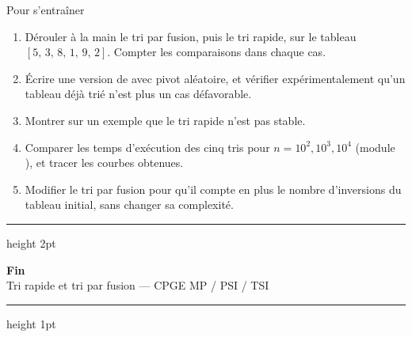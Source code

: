 \documentclass[11pt,aspectratio=169]{beamer}
\begin{document}
\begin{frame}{Pour s'entraîner}
\begin{enumerate}\small\setlength\itemsep{5pt}
  \item Dérouler à la main le tri par fusion, puis le tri rapide, sur le tableau
        $[5,\,3,\,8,\,1,\,9,\,2]$. Compter les comparaisons dans chaque cas.
  \item Écrire une version de  avec pivot aléatoire, et vérifier
        expérimentalement qu'un tableau déjà trié n'est plus un cas défavorable.
  \item Montrer sur un exemple que le tri rapide n'est pas stable.
  \item Comparer les temps d'exécution des cinq tris pour
        $n=10^2,10^3,10^4$ (module ), et tracer les courbes obtenues.
  \item Modifier le tri par fusion pour qu'il compte en plus le nombre d'inversions
        du tableau initial, sans changer sa complexité.
\end{enumerate}
\end{frame}

\begin{frame}[plain]
  \vfill
  \begin{center}
    {\color{teal}\hrule height 2pt}\vspace{10pt}
    {\LARGE\bfseries\color{teal} Fin}\\[8pt]
    {\normalsize Tri rapide et tri par fusion --- CPGE MP / PSI / TSI}\\[10pt]
    {\color{teal}\hrule height 1pt}
  \end{center}
  \vfill
\end{frame}
\end{document}
